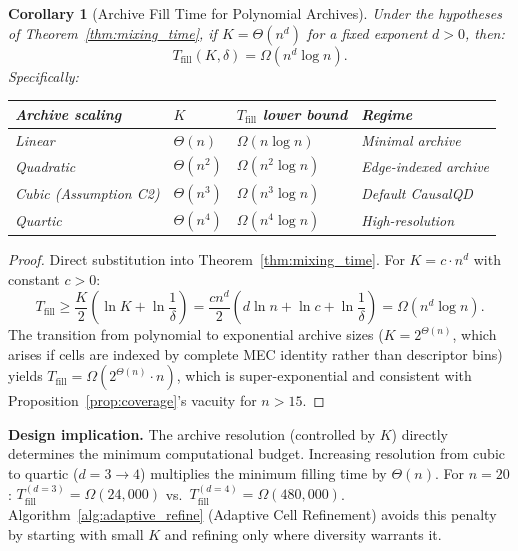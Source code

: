 \documentclass{article}
\theoremstyle{definition}
\theoremstyle{plain}
\newtheorem{corollary}{Corollary}
\theoremstyle{remark}
\begin{document}
\begin{corollary}[Archive Fill Time for Polynomial Archives]
\label{cor:poly_fill}
Under the hypotheses of Theorem~\ref{thm:mixing_time}, if $K = \Theta(n^d)$ for a fixed
exponent $d > 0$, then:
\begin{equation}
  T_{\mathrm{fill}}(K, \delta) = \Omega(n^d \log n).
\end{equation}
Specifically:
\begin{center}
\begin{tabular}{llll}
\toprule
\textbf{Archive scaling} & $K$ & $T_{\mathrm{fill}}$ \textbf{lower bound} & \textbf{Regime} \\
\midrule
Linear & $\Theta(n)$ & $\Omega(n \log n)$ & Minimal archive \\
Quadratic & $\Theta(n^2)$ & $\Omega(n^2 \log n)$ & Edge-indexed archive \\
Cubic (Assumption C2) & $\Theta(n^3)$ & $\Omega(n^3 \log n)$ & Default CausalQD \\
Quartic & $\Theta(n^4)$ & $\Omega(n^4 \log n)$ & High-resolution \\
\bottomrule
\end{tabular}
\end{center}
\end{corollary}

\begin{proof}
Direct substitution into Theorem~\ref{thm:mixing_time}. For $K = c \cdot n^d$ with
constant $c > 0$:
\begin{equation}
  T_{\mathrm{fill}} \geq \frac{K}{2}\left(\ln K + \ln\frac{1}{\delta}\right)
  = \frac{c n^d}{2}\left(d \ln n + \ln c + \ln\frac{1}{\delta}\right)
  = \Omega(n^d \log n).
\end{equation}
The transition from polynomial to exponential archive sizes ($K = 2^{\Theta(n)}$, which
arises if cells are indexed by complete MEC identity rather than descriptor bins)
yields $T_{\mathrm{fill}} = \Omega(2^{\Theta(n)} \cdot n)$, which is super-exponential and
consistent with Proposition~\ref{prop:coverage}'s vacuity for $n > 15$.
\end{proof}

\textbf{Design implication.} The archive resolution (controlled by $K$) directly
determines the minimum computational budget. Increasing resolution from cubic to quartic
($d = 3 \to 4$) multiplies the minimum filling time by $\Theta(n)$. For $n = 20$:
$T_{\mathrm{fill}}^{(d=3)} = \Omega(24{,}000)$ vs.\ $T_{\mathrm{fill}}^{(d=4)} =
\Omega(480{,}000)$. Algorithm~\ref{alg:adaptive_refine} (Adaptive Cell Refinement) avoids
this penalty by starting with small $K$ and refining only where diversity warrants it.
\end{document}
